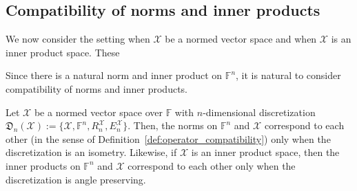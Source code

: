 \documentclass[a4paper]{paper}
\newcommand{\Discr}{\mathfrak{D}}
\newcommand{\Spc}[1]{\mathscr{#1}}
\newcommand{\Field}{\mathbb{F}}
\newcommand*{\EXT}[2]{\ensuremath{E_{#1}^{#2}}}
\newcommand*{\REST}[2]{\ensuremath{R_{#1}^{#2}}}
\newcommand*{\RnX}{\ensuremath{\REST{n}{\Spc{X}}}}
\newcommand*{\EnX}{\ensuremath{\EXT{n}{\Spc{X}}}}
\begin{document}
\subsection{Compatibility of norms and inner products}

We now consider the setting when $\Spc{X}$ be a normed vector space and when $\Spc{X}$ is an inner product space. These 

Since there is a 
natural norm and inner product on
$\Field^{n}$, it is natural to consider compatibility of norms and inner products. 
\begin{theorem}\label{ThmNormInnerProd}
  Let $\Spc{X}$ be a normed vector space over $\Field$ with $n$-dimensional
  discretization $\Discr_{n}(\Spc{X}):=\{\Spc{X},\Field^{n},\RnX,\EnX\}$. 
  Then, the norms on $\Field^{n}$ and $\Spc{X}$ correspond to each other 
  (in the sense of Definition~\ref{def:operator_compatibility}) only when the discretization is an isometry. 
  Likewise, if $\Spc{X}$ is an inner product space, then the 
  inner products on $\Field^{n}$ and $\Spc{X}$  
  correspond to each other only when the discretization is angle preserving.
\end{theorem}
\end{document}
